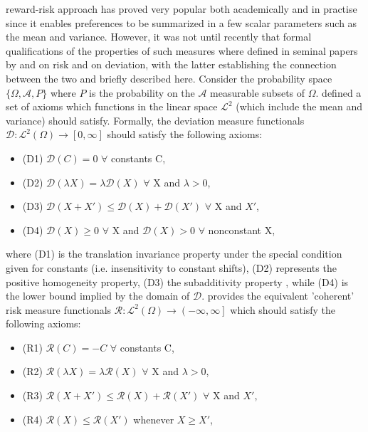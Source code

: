 reward-risk approach has proved very popular both academically and in
practise since it enables preferences to be summarized in a few scalar
parameters such as the mean and variance. However, it was not until recently
that formal qualifications of the properties of such measures where defined
in seminal papers by \citet{Artzner1999} and \citet{Acerbi2002a} on
risk and \citet{Rockafellar2006} on deviation, with the latter
establishing the connection between the two and briefly described here.
Consider the probability space $\{\Omega, \mathcal{A}, P\}$ where $P$ is the
probability on the $\mathcal{A}$ measurable subsets of $\Omega$.
\citet{Rockafellar2006} defined a set of axioms which functions in the
linear space $\mathcal{L}^2$ (which include the mean and variance) should
satisfy. Formally, the deviation measure functionals
$\mathcal{D}:{\mathcal{L}^2}(\Omega) \to \left[ {0,\infty } \right]$ should
satisfy the following axioms:
\begin{itemize}
\item (D1) $\mathcal{D}\left(C\right)=0$ $\forall$ constants C,
\item (D2) $\mathcal{D}\left(\lambda X\right)=\lambda\mathcal{D}\left(X\right)$ $\forall$ X and $\lambda>0$,
\item (D3) $\mathcal{D}\left(X+X'\right)\leq \mathcal{D}\left(X\right)+\mathcal{D}\left(X'\right)$ $\forall$ X and $X'$,
\item (D4) $\mathcal{D}\left(X\right)\geq 0$ $\forall$ X and $\mathcal{D}\left(X\right)>0$ $\forall$ nonconstant X,
\end{itemize}
where (D1) is the translation invariance property under the special condition
given  for constants (i.e. insensitivity to constant shifts), (D2) represents
the positive homogeneity property, (D3) the subadditivity property , while
(D4) is the lower bound implied by the domain of $\mathcal{D}$.
\citet{Artzner1999} provides the equivalent 'coherent' risk measure
functionals $\mathcal{R}:{\mathcal{L}^2}(\Omega) \to \left( {-\infty,\infty }
\right]$ which should satisfy the following axioms:
\begin{itemize}
\item (R1) $\mathcal{R}\left(C\right)=-C$ $\forall$ constants C,
\item (R2) $\mathcal{R}\left(\lambda X\right)=\lambda\mathcal{R}\left(X\right)$ $\forall$ X and $\lambda>0$,
\item (R3) $\mathcal{R}\left(X+X'\right)\leq \mathcal{R}\left(X\right)+\mathcal{R}\left(X'\right)$ $\forall$ X and $X'$,
\item (R4) $\mathcal{R}\left(X\right)\leq \mathcal{R}\left(X'\right)$ whenever $X\geq X'$,
\end{itemize}
